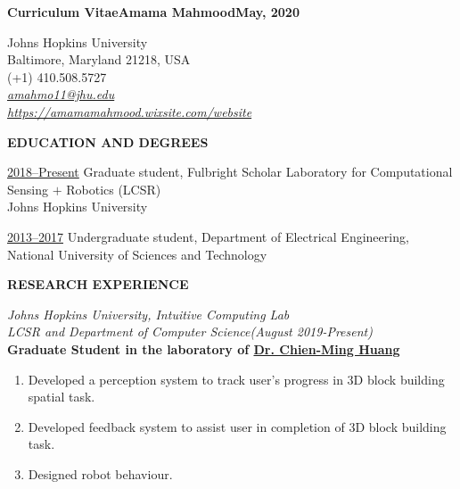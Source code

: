 



\setlength{\parindent}{0pt}

\setlength{\parskip}{6pt}

\frenchspacing

\footnotesize

\textbf{\small Curriculum Vitae\hfill\large Amama Mahmood\hfill\small May, 2020}
\begin{center}
Johns Hopkins University\\
Baltimore, Maryland 21218, USA\\
(+1) 410.508.5727\\
{\color{blue} \ul{\sffamily\textit{amahmo11@jhu.edu}}}\\
{\color{blue} \ul{\sffamily\textit{https://amamamahmood.wixsite.com/website}}}
\end{center}

\sffamily

\textbf{EDUCATION AND DEGREES}

\ul{2018--Present} Graduate student, Fulbright Scholar
Laboratory for Computational Sensing $+$ Robotics (LCSR)\\
Johns Hopkins University

\ul{2013--2017} Undergraduate student,
Department of Electrical Engineering,
National University of Sciences and Technology


\textbf{RESEARCH EXPERIENCE}

\textit{Johns Hopkins University, Intuitive Computing Lab}\\
\textit{LCSR and Department of Computer Science\hfill(August 2019-Present)}\\
\textbf{\rmfamily Graduate Student in the laboratory of \ul{Dr. Chien-Ming Huang}}

\begin{enumerate}
\item Developed a perception system to track user's progress in 3D block building spatial task.
\item Developed feedback system to assist user in completion of 3D block building task. 
\item Designed robot behaviour.
\end{enumerate}

